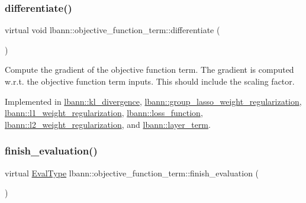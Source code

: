 \mbox{\label{classlbann_1_1objective__function__term_ad009c3cfbe1cf2fbb6cce015b16fdac5}} 
\subsubsection{\texorpdfstring{differentiate()}{differentiate()}}
{\footnotesize\ttfamily virtual void lbann\+::objective\+\_\+function\+\_\+term\+::differentiate (\begin{DoxyParamCaption}{ }\end{DoxyParamCaption})\hspace{0.3cm}{\ttfamily [pure virtual]}}

Compute the gradient of the objective function term. The gradient is computed w.\+r.\+t. the objective function term inputs. This should include the scaling factor. 

Implemented in \hyperlink{classlbann_1_1kl__divergence_aeb39d1ba1e74874cbf396fbe137ff601}{lbann\+::kl\+\_\+divergence}, \hyperlink{classlbann_1_1group__lasso__weight__regularization_a9d5843ebd2c3a1f77013c7b2bebb7a69}{lbann\+::group\+\_\+lasso\+\_\+weight\+\_\+regularization}, \hyperlink{classlbann_1_1l1__weight__regularization_a329af165a876f4c1668aee84339e9ad2}{lbann\+::l1\+\_\+weight\+\_\+regularization}, \hyperlink{classlbann_1_1loss__function_adbd03ef952ee1055e3dd98f06d33324f}{lbann\+::loss\+\_\+function}, \hyperlink{classlbann_1_1l2__weight__regularization_a64f5cd1a4a30727a81f112e51367700e}{lbann\+::l2\+\_\+weight\+\_\+regularization}, and \hyperlink{classlbann_1_1layer__term_a857df1636853ea9b805611c55ff791e3}{lbann\+::layer\+\_\+term}.

\mbox{\label{classlbann_1_1objective__function__term_a7a82f2cdbc954655ac860896306aed0c}} 
\subsubsection{\texorpdfstring{finish\+\_\+evaluation()}{finish\_evaluation()}}
{\footnotesize\ttfamily virtual \hyperlink{base_8hpp_a3266f5ac18504bbadea983c109566867}{Eval\+Type} lbann\+::objective\+\_\+function\+\_\+term\+::finish\+\_\+evaluation (\begin{DoxyParamCaption}{ }\end{DoxyParamCaption})\hspace{0.3cm}{\ttfamily [pure virtual]}}


